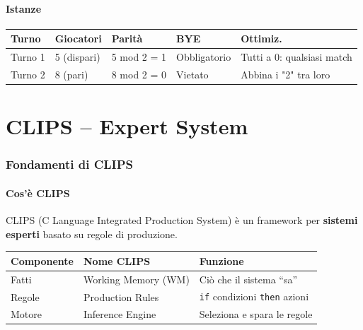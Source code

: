 \documentclass[12pt,a4paper]{article}
\begin{document}
\subsection{Istanze}

\begin{center}
\begin{tabular}{lllll}
\toprule
\textbf{Turno} & \textbf{Giocatori} & \textbf{Parità} & \textbf{BYE} & \textbf{Ottimiz.} \\
\midrule
Turno 1 & 5 (dispari) & 5 mod 2 = 1 & Obbligatorio & Tutti a 0: qualsiasi match \\
Turno 2 & 8 (pari) & 8 mod 2 = 0 & Vietato & Abbina i "2" tra loro \\
\bottomrule
\end{tabular}
\end{center}

\part{CLIPS -- Expert System}

\section{Fondamenti di CLIPS}

\subsection{Cos'è CLIPS}

CLIPS (C Language Integrated Production System) è un framework per
\textbf{sistemi esperti} basato su regole di produzione.

\begin{center}
\begin{tabular}{lll}
\toprule
\textbf{Componente} & \textbf{Nome CLIPS} & \textbf{Funzione} \\
\midrule
Fatti & Working Memory (WM) & Ciò che il sistema ``sa'' \\
Regole & Production Rules & \texttt{if} condizioni \texttt{then} azioni \\
Motore & Inference Engine & Seleziona e spara le regole \\
\bottomrule
\end{tabular}
\end{center}
\end{document}
